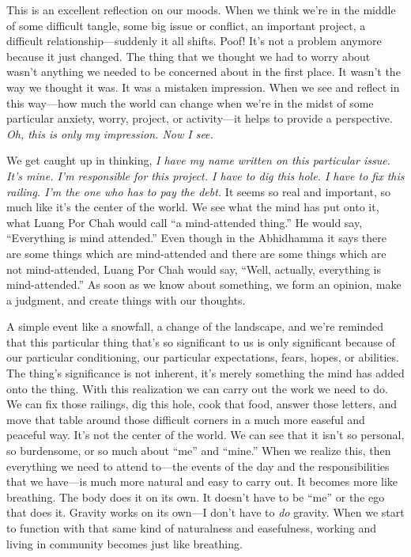 This is an excellent reflection on our moods. When we think we're in 
the middle of some difficult tangle, some big issue or conflict, an 
important project, a difficult relationship---suddenly it all shifts. 
Poof! It's not a problem anymore because it just changed. The thing 
that we thought we had to worry about wasn't anything we needed to be 
concerned about in the first place. It wasn't the way we thought it 
was. It was a mistaken impression. When we see and reflect in this 
way---how much the world can change when we're in the midst of some 
particular anxiety, worry, project, or activity---it helps to provide a 
perspective. \emph{Oh, this is only my impression. Now I see.}

We get caught up in thinking, \emph{I have my name written on this 
particular issue. It's mine. I'm responsible for this project. I have 
to dig this hole. I have to fix this railing. I'm the one who has to 
pay the debt.} It seems so real and important, so much like it's the 
center of the world. We see what the mind has put onto it, what Luang 
Por Chah would call ``a mind-attended thing.'' He would say, 
``Everything is mind attended.'' Even though in the Abhidhamma it says 
there are some things which are mind-attended and there are some things 
which are not mind-attended, Luang Por Chah would say, ``Well, 
actually, everything is mind-attended.'' As soon as we know about 
something, we form an opinion, make a judgment, and create things with 
our thoughts.

A simple event like a snowfall, a change of the landscape, and we're 
reminded that this particular thing that's so significant to us is only 
significant because of our particular conditioning, our particular 
expectations, fears, hopes, or abilities. The thing's significance is 
not inherent, it's merely something the mind has added onto the thing. 
With this realization we can carry out the work we need to do. We can 
fix those railings, dig this hole, cook that food, answer those 
letters, and move that table around those difficult corners in a much 
more easeful and peaceful way. It's not the center of the world. We can 
see that it isn't so personal, so burdensome, or so much about ``me'' 
and ``mine.'' When we realize this, then everything we need to attend 
to---the events of the day and the responsibilities that we have---is 
much more natural and easy to carry out. It becomes more like 
breathing. The body does it on its own. It doesn't have to be ``me'' or 
the ego that does it. Gravity works on its own---I don't have to 
\emph{do} gravity. When we start to function with that same kind of 
naturalness and easefulness, working and living in community becomes 
just like breathing.

